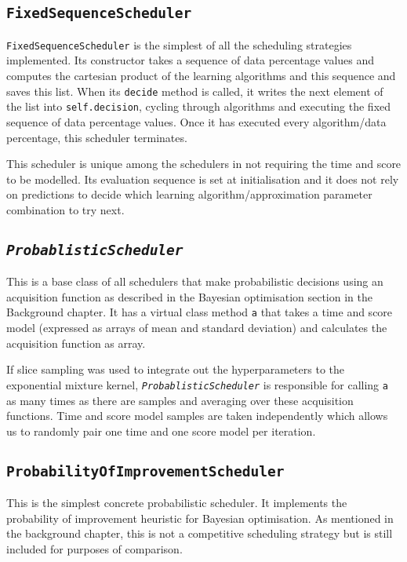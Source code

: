 \documentclass[a4paper,12pt,twoside,openright]{report}
\begin{document}
\subsection{\texttt{FixedSequenceScheduler}}
\texttt{FixedSequenceScheduler} is the simplest of all the scheduling strategies implemented. Its constructor takes a sequence of data percentage values and computes the cartesian product of the learning algorithms and this sequence and saves this list. When its \texttt{decide} method is called, it writes the next element of the list into \texttt{self.decision}, cycling through algorithms and executing the fixed sequence of data percentage values. Once it has executed every algorithm/data percentage, this scheduler terminates.

This scheduler is unique among the schedulers in not requiring the time and score to be modelled. Its evaluation sequence is set at initialisation and it does not rely on predictions to decide which learning algorithm/approximation parameter combination to try next.



\subsection{\texttt{\textit{ProbablisticScheduler}}}
This is a base class of all schedulers that make probabilistic decisions using an acquisition function as described in the Bayesian optimisation section in the Background chapter. It has a virtual class method \texttt{a} that takes a time and score model (expressed as arrays of mean and standard deviation) and calculates the acquisition function as array.

If slice sampling was used to integrate out the hyperparameters to the exponential mixture kernel, \texttt{\textit{ProbablisticScheduler}} is responsible for calling \texttt{a} as many times as there are samples and averaging over these acquisition functions. Time and score model samples are taken independently which allows us to randomly pair one time and one score model per iteration.

\subsection{\texttt{ProbabilityOfImprovementScheduler}}
This is the simplest concrete probabilistic scheduler. It implements the probability of improvement heuristic for Bayesian optimisation. As mentioned in the background chapter, this is not a competitive scheduling strategy but is still included for purposes of comparison.
\end{document}
